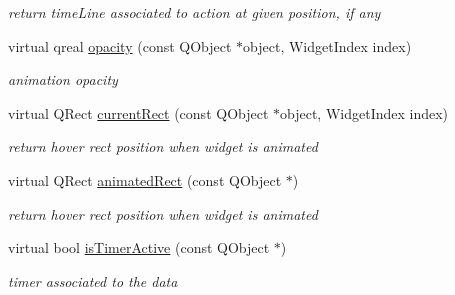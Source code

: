 \begin{DoxyCompactItemize}
\begin{DoxyCompactList}\small\item\em return time\+Line associated to action at given position, if any \end{DoxyCompactList}\item 
\mbox{\label{class_menu_engine_v2_a4f635969b7963d1cfbd033e515058b42}} 
virtual qreal \hyperlink{class_menu_engine_v2_a4f635969b7963d1cfbd033e515058b42}{opacity} (const Q\+Object $\ast$object, Widget\+Index index)
\begin{DoxyCompactList}\small\item\em animation opacity \end{DoxyCompactList}\item 
\mbox{\label{class_menu_engine_v2_af5b23e7e0034d36209ac3a0fbfb96f7f}} 
virtual Q\+Rect \hyperlink{class_menu_engine_v2_af5b23e7e0034d36209ac3a0fbfb96f7f}{current\+Rect} (const Q\+Object $\ast$object, Widget\+Index index)
\begin{DoxyCompactList}\small\item\em return \textquotesingle{}hover\textquotesingle{} rect position when widget is animated \end{DoxyCompactList}\item 
\mbox{\label{class_menu_engine_v2_ab696c84bbd3fd5182e7ece21bb06dad5}} 
virtual Q\+Rect \hyperlink{class_menu_engine_v2_ab696c84bbd3fd5182e7ece21bb06dad5}{animated\+Rect} (const Q\+Object $\ast$)
\begin{DoxyCompactList}\small\item\em return \textquotesingle{}hover\textquotesingle{} rect position when widget is animated \end{DoxyCompactList}\item 
\mbox{\label{class_menu_engine_v2_a32d94ce2512ccc6ca8d05c287409646c}} 
virtual bool \hyperlink{class_menu_engine_v2_a32d94ce2512ccc6ca8d05c287409646c}{is\+Timer\+Active} (const Q\+Object $\ast$)
\begin{DoxyCompactList}\small\item\em timer associated to the data \end{DoxyCompactList}\item 
\mbox{\label{class_menu_engine_v2_a636dca1da0caffa85542ae84eb7d479d}} 

\end{DoxyCompactItemize}
